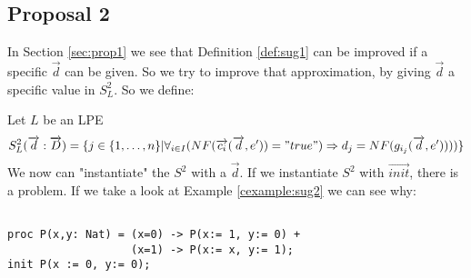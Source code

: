 \documentclass[a4paper,10pt]{article}
\newcommand{\ovr}{\overrightarrow}
\begin{document}
\subsection{Proposal 2}
In Section \ref{sec:prop1} we see that Definition \ref{def:sug1} can be improved if a specific $\ovr{d}$ can be given. So we try to improve that approximation, by giving $\ovr{d}$ a specific value in $S_L^2$. So we define: 

\begin{defn} Let $L$ be an LPE\label{def:sug2} 
\begin{displaymath}
S_L^2(\ovr{d}:\ovr{D})=
\lbrace   
j \in \lbrace 1, \ldots , n \rbrace \vert \forall_{i\in I} (NF(\ovr{c_i}(\ovr{d},e')) = "true") \Rightarrow d_j = NF(g_{i_j}(\ovr{d},e'))))\rbrace
\end{displaymath}
We now can "instantiate" the $S^2$ with a $\ovr{d}$. If we instantiate $S^2$ with $\ovr{init}$, there is a problem. If we take a look at Example \ref{cexample:sug2} we can see why:
\begin{example} [Let $E2$ be]\label{cexample:sug2}\begin{verbatim} 
 
proc P(x,y: Nat) = (x=0) -> P(x:= 1, y:= 0) +
                   (x=1) -> P(x:= x, y:= 1);
init P(x := 0, y:= 0);


\end{verbatim}
\end{example}
\end{defn}
\end{document}
